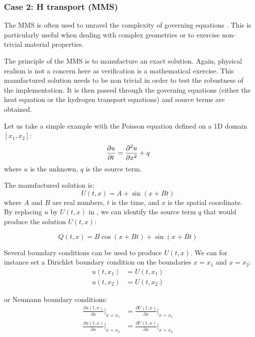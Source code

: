 \subsubsection{Case 2: H transport (MMS)} \label{mms}

The MMS is often used to unravel the complexity of governing equations .
This is particularly useful when dealing with complex geometries or to exercise non-trivial material properties.

The principle of the MMS is to manufacture an exact solution.
Again, physical realism is not a concern here as verification is a mathematical exercise.
This manufactured solution needs to be non trivial in order to test the robustness of the implementation.
It is then passed through the governing equations (either the heat equation or the hydrogen transport equations) and source terms are obtained.

Let us take a simple example with the Poisson equation defined on a 1D domain $[x_1, x_2]$:
\begin{equation}
    \frac{\partial u}{\partial t} = \frac{\partial^2 u}{\partial x^2} + q
    \labeq{poisson eq demo mms}
\end{equation}
where $u$ is the unknown, $q$ is the source term.

The manufactured solution is:
\begin{equation}
    U(t, x) = A + \sin{(x + B t)}
\end{equation}
where $A$ and $B$ are real numbers, $t$ is the time, and $x$ is the spatial coordinate.
By replacing $u$ by $U(t, x)$ in , we can identify the source term $q$ that would produce the solution $U(t, x)$:

\begin{equation}
    Q(t, x) = B \cos{(x + B t)} + \sin{(x + B t)}
\end{equation}

Several boundary conditions can be used to produce $U(t, x)$.
We can for instance set a Dirichlet boundary condition on the boundaries $x=x_1$ and $x=x_2$:
\begin{align}
    u(t, x_1) &= U(t, x_1) \\
    u(t, x_2) &= U(t, x_2)
\end{align}

or Neumann boundary conditions:
\begin{align}
    \frac{\partial u(t, x)}{\partial x}\Big | _{ x=x_1} &= \frac{\partial U(t, x)}{\partial x} \Big | _{ x=x_1} \\
    \frac{\partial u(t, x)}{\partial x}\Big | _{ x=x_2} &= \frac{\partial U(t, x)}{\partial x} \Big | _{ x=x_2}
\end{align}

